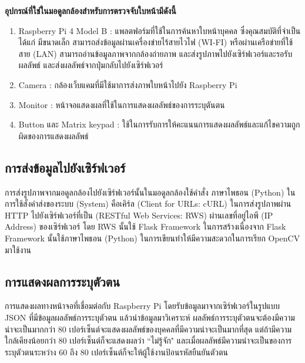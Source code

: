 \textbf{อุปกรณ์ที่ใช่ในมอดูลกล้องสำหรับการตรวจจับใบหน้ามีดังนี้}
\begin{enumerate}
  \item Raspberry Pi 4 Model B : แพลตฟอร์มที่ใช้ในการค้นหาใบหน้าบุคคล ซึ่งคุณสมบัติที่จำเป็นได้แก่ 
  มีขนาดเล็ก สามารถส่งข้อมูลผ่านเครื่องข่ายไร้สายไวไฟ (WI-FI) หรือผ่านเครือข่ายที่ใช้สาย (LAN) สามารถอ่านข้อมูลภาพจากกล้องถ่ายภาพ 
  และส่งรูปภาพไปยังเซิร์ฟเวอร์และรอรับผลลัพธ์ และส่งผลลัพธ์จากปุ่มกลับไปยังเซิร์ฟเวอร์
  \item Camera : กล้องเว็บแคมที่มีใช้มาการส่งภาพใบหน้าไปยัง Raspberry Pi
  \item Monitor : หน้าจอแสดงผลที่ใช้ในการแสดงผลลัพธ์ของการระบุตันตน
  \item Button และ Matrix keypad : ใช้ในการรับการให้คะแนนการแสดงผลลัพธ์และแก้ไขความถูกผิดของการแสดงผลลัพธ์
\end{enumerate}

\subsection{การส่งข้อมูลไปยังเซิร์ฟเวอร์}
การส่งรูปภาพจากมอดูลกล้องไปยังเซิร์ฟเวอร์นั้นในมอดูลกล้องใช้คำสั่ง ภาษาไพธอน (Python) ในการใช้สั่งคำส่งของระบบ (System)
คือเคิร์ล  (Client for URLs: cURL) ในการส่งรูปภาพผ่าน HTTP ไปยังเซิร์ฟเวอร์ที่เป็น (RESTful Web Services: RWS)
ผ่านเลขที่อยู่ไอพี (IP Address) ของเซิร์ฟเวอร์ โดย RWS นั้นใช้ Flask Framework 
ในการสร้างเนื่องจาก Flask Framework นั้นใช้ภาษาไพธอน (Python) ในการเขียนทำให้มีความสะดวกในการเรียก OpenCV มาใช้งาน

\subsection{การแสดงผลการระบุตัวตน}
การแสดงผลทางหน้าจอที่เชื่อมต่อกับ Raspberry Pi โดยรับข้อมูลมาจากเซิร์ฟเวอร์ในรูปแบบ JSON ที่มีข้อมูลผลลัพธ์การระบุตัวตน แล้วนำข้อมูลมาวิเคราะห์
ผลลัพธ์การระบุตัวตนจะต้องมีความน่าจะเป็นมากกว่า 80 เปอร์เซ็นต์จะแสดงผลลัพธ์ของบุคคลที่มีความน่าจะเป็นมากที่สุด แต่ถ้ามีความใกล้เคียงน้อยกว่า 80 เปอร์เซ็นต์ก็จะแสดงผลว่า ``ไม่รู้จัก"
และเมื่อผลลัพธ์มีความน่าจะเป็นของการระบุตัวตนระหว่าง 60 ถึง 80 เปอร์เซ็นต์ก็จะให้ผู้ใช้งานป้อนรหัสยืนยันตัวตน


